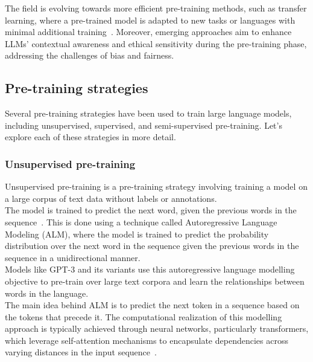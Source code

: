 The field is evolving towards more efficient pre-training methods, such as transfer learning, where a pre-trained model is adapted to new tasks or languages with minimal additional training~\cite{ruder2019transfer}.
Moreover, emerging approaches aim to enhance LLMs' contextual awareness and ethical sensitivity during the pre-training phase, addressing the challenges of bias and fairness.

\subsection{Pre-training strategies}
\label{subsec:pre-training-strategies}

Several pre-training strategies have been used to train large language models, including unsupervised, supervised, and semi-supervised pre-training.
Let's explore each of these strategies in more detail.

\subsubsection{Unsupervised pre-training}
\label{subsubsec:unsupervised-pre-training}

Unsupervised pre-training is a pre-training strategy involving training a model on a large corpus of text data without labels or annotations.\\
The model is trained to predict the next word, given the previous words in the sequence~\cite{brown2020language}.
This is done using a technique called Autoregressive Language Modeling (ALM), where the model is trained to predict the probability distribution over the next word in the sequence given the previous words in the sequence in a unidirectional manner.\\
Models like GPT-3 and its variants use this autoregressive language modelling objective to pre-train over large text corpora and learn the relationships between words in the language.\\
The main idea behind ALM is to predict the next token in a sequence based on the tokens that precede it.
The computational realization of this modelling approach is typically achieved through neural networks, particularly transformers, which leverage self-attention mechanisms to encapsulate dependencies across varying distances in the input sequence~\cite{vaswani2023attention}.

